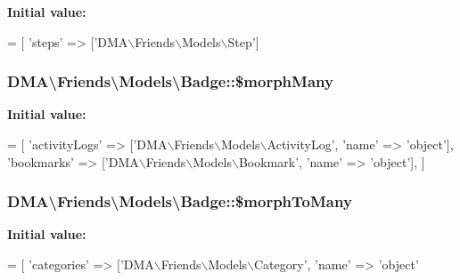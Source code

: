 {\bfseries Initial value\+:}
\begin{DoxyCode}
= [
        \textcolor{stringliteral}{'steps'} => [\textcolor{stringliteral}{'DMA\(\backslash\)Friends\(\backslash\)Models\(\backslash\)Step'}]
\end{DoxyCode}
\hypertarget{classDMA_1_1Friends_1_1Models_1_1Badge_a239fed984baad287f15badaaece428ff}{
\subsubsection[{\$morph\+Many}]{\setlength{\rightskip}{0pt plus 5cm}D\+M\+A\textbackslash{}\+Friends\textbackslash{}\+Models\textbackslash{}\+Badge\+::\$morph\+Many}}\label{classDMA_1_1Friends_1_1Models_1_1Badge_a239fed984baad287f15badaaece428ff}
{\bfseries Initial value\+:}
\begin{DoxyCode}
= [
        \textcolor{stringliteral}{'activityLogs'}  => [\textcolor{stringliteral}{'DMA\(\backslash\)Friends\(\backslash\)Models\(\backslash\)ActivityLog'}, \textcolor{stringliteral}{'name'} => \textcolor{stringliteral}{'object'}],
        \textcolor{stringliteral}{'bookmarks'}     => [\textcolor{stringliteral}{'DMA\(\backslash\)Friends\(\backslash\)Models\(\backslash\)Bookmark'}, \textcolor{stringliteral}{'name'} => \textcolor{stringliteral}{'object'}],
    ]
\end{DoxyCode}
\hypertarget{classDMA_1_1Friends_1_1Models_1_1Badge_a2efb4ca933422dfb4ca416676d73cad0}{
\subsubsection[{\$morph\+To\+Many}]{\setlength{\rightskip}{0pt plus 5cm}D\+M\+A\textbackslash{}\+Friends\textbackslash{}\+Models\textbackslash{}\+Badge\+::\$morph\+To\+Many}}\label{classDMA_1_1Friends_1_1Models_1_1Badge_a2efb4ca933422dfb4ca416676d73cad0}
{\bfseries Initial value\+:}
\begin{DoxyCode}
= [
        \textcolor{stringliteral}{'categories'}    => [\textcolor{stringliteral}{'DMA\(\backslash\)Friends\(\backslash\)Models\(\backslash\)Category'}, \textcolor{stringliteral}{'name'} => \textcolor{stringliteral}{'object'}
\end{DoxyCode}
